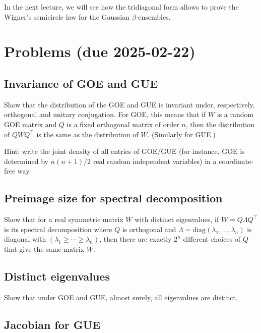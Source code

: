 \documentclass[letterpaper,11pt,oneside,reqno]{article}
\numberwithin{equation}{section}
\theoremstyle{definition}
\begin{document}
In the next lecture, we will see how the tridiagonal form
allows to prove the Wigner's semicircle law for the
Gaussian \(\beta\)-ensembles.



\appendix
\setcounter{section}{2}

\section{Problems (due 2025-02-22)}

\subsection{Invariance of GOE and GUE}
\label{prob:invariance_GOE_GUE}

Show that the distribution of the GOE and GUE is
invariant under, respectively, orthogonal and unitary conjugation.
For GOE, this means that if \(W\)
is a random GOE matrix and \(Q\) is a fixed orthogonal
matrix of order $n$, then the distribution
of \(QWQ^\top\) is the same as the distribution of \(W\).
(Similarly for GUE.)

\medskip
\noindent
Hint: write the joint density of all entries of GOE/GUE (for instance, GOE
is determined by $n(n+1)/2$ real random independent variables)
in a coordinate-free way.


\subsection{Preimage size for spectral decomposition}
\label{prob:GOE-preimage}

Show that for a real symmetric matrix $W$ with distinct eigenvalues,
if $W=Q\Lambda Q^\top$ is its spectral decomposition
where $Q$ is orthogonal and $\Lambda=\mathrm{diag}(\lambda_1,\ldots,\lambda_n)$
is diagonal with $(\lambda_1\ge \cdots\ge \lambda_n)$,
then there are exactly $2^n$ different choices of $Q$
that give the same matrix $W$.

\subsection{Distinct eigenvalues}
\label{prob:distinct-eigenvalues}

Show that under GOE and GUE, almost surely,
all eigenvalues are distinct.

\subsection{Jacobian for GUE}
\label{prob:Jacobian-GUE}
\end{document}
